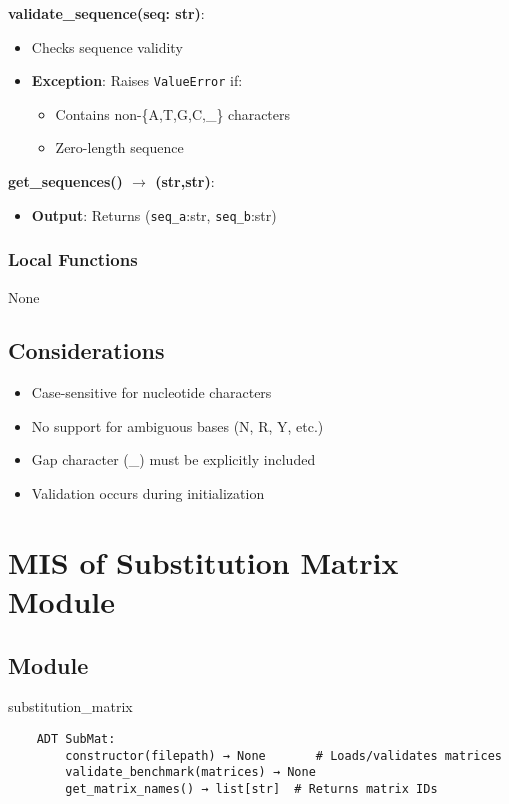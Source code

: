 \documentclass[12pt, titlepage]{article}
\begin{document}
\noindent \textbf{validate\_sequence(seq: str)}:
\begin{itemize}
    \item Checks sequence validity
    \item \textbf{Exception}: Raises \texttt{ValueError} if:
    \begin{itemize}
        \item Contains non-\{A,T,G,C,\_\} characters
        \item Zero-length sequence
    \end{itemize}
\end{itemize}

\noindent \textbf{get\_sequences() $\rightarrow$ (str,str)}:
\begin{itemize}
    \item \textbf{Output}: Returns (\texttt{seq\_a}:str, \texttt{seq\_b}:str)
\end{itemize}

\subsubsection{Local Functions}

None

\subsection{Considerations}

\begin{itemize}
    \item Case-sensitive for nucleotide characters
    \item No support for ambiguous bases (N, R, Y, etc.)
    \item Gap character (\_) must be explicitly included
    \item Validation occurs during initialization
\end{itemize}

\newpage 
\section{MIS of Substitution Matrix Module} \label{mSM}

\subsection{Module}

substitution\_matrix
\begin{verbatim}
    ADT SubMat:
        constructor(filepath) → None       # Loads/validates matrices
        validate_benchmark(matrices) → None
        get_matrix_names() → list[str]  # Returns matrix IDs
\end{verbatim}
\end{document}
